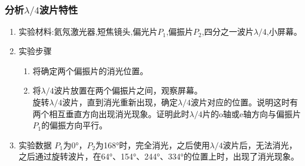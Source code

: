 \documentclass[dvipsnames, svgnames,a4paper,11pt]{article}
\begin{document}
\subsubsection{分析$\lambda/4$波片特性}
\begin{enumerate}
	
	\item$\text{实验材料:氦氖激光器,短焦镜头,偏光片$P_1$,偏振片$P_2$,四分之一波片}\lambda/4\text{,小屏幕。}$
	\item 实验步骤


	 \begin{enumerate}
		\item  将确定两个偏振片的消光位置。
		\item 将$\lambda/4$波片放置在两个偏振片之间，观察屏幕。\\
		旋转$\lambda/4$波片，直到消光重新出现，确定$\lambda/4$波片对应的位置。说明这时有两个相互垂直方向出现消光现象。证明此时$\lambda/4$片的o轴或e轴方向与偏振片$P_1$的偏振方向平行。
	  \end{enumerate}
	 \item 实验数据
      $P_1$为0°，$P_2$为168°时，完全消光，之后使用$\lambda/4$波片后，无法消光，之后通过旋转波片，在64°、154°、244°、334°的位置上时，出现了消光现象。
\end{enumerate}
		
\end{document}
